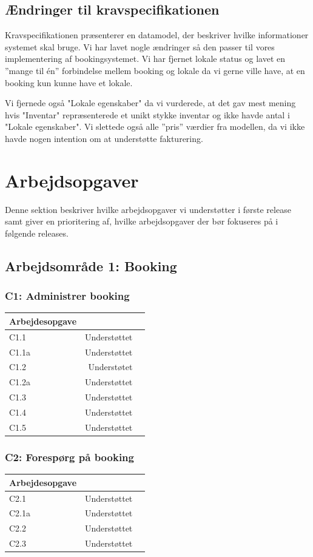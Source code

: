 \subsection{Ændringer til kravspecifikationen}
\label{Baggrund_kravspecifikationen_Aendringer}
Kravspecifikationen præsenterer en datamodel, der beskriver hvilke informationer systemet skal bruge. Vi har lavet nogle ændringer så den passer til vores implementering af bookingsystemet. Vi har fjernet lokale status og lavet en ”mange til én” forbindelse mellem booking og lokale da vi gerne ville have, at en booking kun kunne have et lokale.

 Vi fjernede også "Lokale egenskaber" da vi vurderede, at det gav mest mening hvis "Inventar" repræsenterede et unikt stykke inventar og ikke havde antal i "Lokale egenskaber". Vi slettede også alle ”pris” værdier fra modellen, da vi ikke havde nogen intention om at understøtte fakturering.
\section{Arbejdsopgaver}
\label{Baggrund_Arb_opgaver}
Denne sektion beskriver hvilke arbejdsopgaver vi understøtter i første release samt giver en prioritering af, hvilke arbejdsopgaver der bør fokuseres på i følgende releases.
\subsection{Arbejdsområde 1: Booking}
\label{Baggrund_Arb_opgaver_Booking}
\subsubsection{C1: Administrer booking}
\begin{tabular}{ | l | r | p{} |}
	\hline
	Arbejdesopgave & \\ 
\hline
	C1.1 & Understøttet \\ 
\hline
	C1.1a & Understøttet \\ 
\hline
	C1.2 & Understøtet \\ 
\hline
	C1.2a & Understøttet \\ 
\hline
	C1.3 & Understøttet \\ 
\hline
	C1.4 & Understøttet \\ 
\hline
	C1.5 & Understøttet \\ 
\hline
\end{tabular}

\subsubsection{C2: Forespørg på booking}
\begin{tabular}{ | l | r | p{} |}
	\hline
	Arbejdesopgave & \\ 
\hline
	C2.1 & Understøttet \\ 
\hline
	C2.1a & Understøttet \\ 
\hline
	C2.2 & Understøttet \\ 
\hline
	C2.3 & Understøttet \\ 
\hline
\end{tabular}

